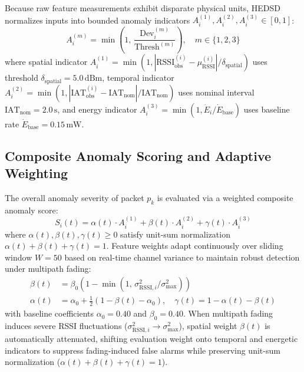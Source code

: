 \documentclass[conference]{IEEEtran}
\begin{document}
Because raw feature measurements exhibit disparate physical units, HEDSD normalizes inputs into bounded anomaly indicators $A_i^{(1)}, A_i^{(2)}, A_i^{(3)} \in [0, 1]$:
\begin{equation}
A_i^{(m)} = \min\!\left(1, \, \frac{\text{Dev}_i^{(m)}}{\text{Thresh}^{(m)}}\right), \quad m \in \{1, 2, 3\}
\label{eq:anomaly_indicators}
\end{equation}
where spatial indicator $A_i^{(1)} = \min(1, |\text{RSSI}_\text{obs}^{(i)} - \mu_\text{RSSI}^{(i)}|/\delta_\text{spatial})$ uses threshold $\delta_\text{spatial} = 5.0\,\text{dBm}$, temporal indicator $A_i^{(2)} = \min(1, |\text{IAT}_\text{obs}^{(i)} - \text{IAT}_\text{nom}|/\text{IAT}_\text{nom})$ uses nominal interval $\text{IAT}_\text{nom} = 2.0\,\text{s}$, and energy indicator $A_i^{(3)} = \min(1, \dot{E}_i / \dot{E}_\text{base})$ uses baseline rate $\dot{E}_\text{base} = 0.15\,\text{mW}$.

\subsection{Composite Anomaly Scoring and Adaptive Weighting}
The overall anomaly severity of packet $p_k$ is evaluated via a weighted composite anomaly score:
\begin{equation}
S_i(t) = \alpha(t) \cdot A_i^{(1)} + \beta(t) \cdot A_i^{(2)} + \gamma(t) \cdot A_i^{(3)}
\label{eq:score}
\end{equation}
where $\alpha(t), \beta(t), \gamma(t) \ge 0$ satisfy unit-sum normalization $\alpha(t) + \beta(t) + \gamma(t) = 1$. Feature weights adapt continuously over sliding window $W = 50$ based on real-time channel variance to maintain robust detection under multipath fading:
\begin{align}
\beta(t) &= \beta_0 \left(1 - \min\!\left(1, \, {\sigma_{\text{RSSI}, i}^2}/{\sigma_{\max}^2}\right)\right) \label{eq:weights} \\
\alpha(t) &= \alpha_0 + \tfrac{1}{2}\left(1 - \beta(t) - \alpha_0\right), \quad \gamma(t) = 1 - \alpha(t) - \beta(t) \label{eq:w_gamma}
\end{align}
with baseline coefficients $\alpha_0 = 0.40$ and $\beta_0 = 0.40$. When multipath fading induces severe RSSI fluctuations ($\sigma_{\text{RSSI}, i}^2 \to \sigma_{\max}^2$), spatial weight $\beta(t)$ is automatically attenuated, shifting evaluation weight onto temporal and energetic indicators to suppress fading-induced false alarms while preserving unit-sum normalization ($\alpha(t) + \beta(t) + \gamma(t) = 1$).
\end{document}

